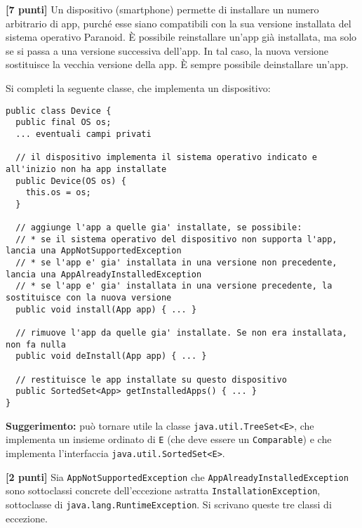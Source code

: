 \documentclass{article}[10pt]
\newcounter{esnu}
\newenvironment{esercizio}{\medskip \noindent {\bf Esercizio\addtocounter{esnu}{1} \arabic{esnu}}}{}
\begin{document}
\begin{esercizio}
\textbf{[7 punti]}
%
Un dispositivo (smartphone) permette di installare un numero arbitrario di app, purch\'e esse siano compatibili
con la sua versione installata del sistema operativo Paranoid. \`E possibile reinstallare un'app gi\`a
installata, ma solo se si passa a una versione successiva dell'app. In tal caso, la nuova
versione sostituisce la vecchia versione della app. \`E sempre possibile deinstallare un'app.

Si completi la seguente classe, che implementa un dispositivo:
%
{\small
\begin{verbatim}
public class Device {
  public final OS os;
  ... eventuali campi privati

  // il dispositivo implementa il sistema operativo indicato e all'inizio non ha app installate
  public Device(OS os) {
    this.os = os;
  }

  // aggiunge l'app a quelle gia' installate, se possibile:
  // * se il sistema operativo del dispositivo non supporta l'app, lancia una AppNotSupportedException
  // * se l'app e' gia' installata in una versione non precedente, lancia una AppAlreadyInstalledException
  // * se l'app e' gia' installata in una versione precedente, la sostituisce con la nuova versione
  public void install(App app) { ... }

  // rimuove l'app da quelle gia' installate. Se non era installata, non fa nulla
  public void deInstall(App app) { ... }

  // restituisce le app installate su questo dispositivo
  public SortedSet<App> getInstalledApps() { ... }
}
\end{verbatim}}

\noindent
\textbf{Suggerimento:} pu\`o tornare utile la classe \texttt{java.util.TreeSet<E>}, che implementa
un insieme ordinato di \texttt{E} (che deve essere un \texttt{Comparable}) e che implementa l'interfaccia \texttt{java.util.SortedSet<E>}.
\end{esercizio}

\begin{esercizio}
\textbf{[2 punti]}
Sia \texttt{AppNotSupportedException} che \texttt{AppAlreadyInstalledException} sono sottoclassi
concrete dell'eccezione astratta \texttt{InstallationException}, sottoclasse di
\texttt{java.lang.RuntimeException}. Si scrivano queste tre classi di eccezione.
\end{esercizio}
\end{document}

